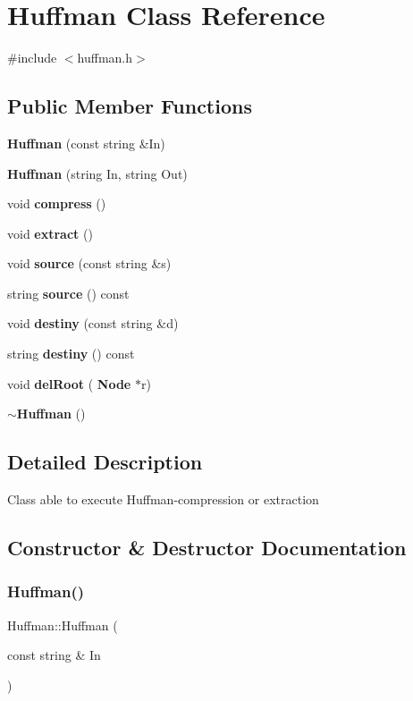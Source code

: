 \section{Huffman Class Reference}
\label{class_huffman}


{\ttfamily \#include $<$huffman.\+h$>$}

\subsection*{Public Member Functions}
\begin{DoxyCompactItemize}
\item 
\textbf{ Huffman} (const string \&In)
\item 
\textbf{ Huffman} (string In, string Out)
\item 
void \textbf{ compress} ()
\item 
void \textbf{ extract} ()
\item 
void \textbf{ source} (const string \&s)
\item 
string \textbf{ source} () const
\item 
void \textbf{ destiny} (const string \&d)
\item 
string \textbf{ destiny} () const
\item 
void \textbf{ del\+Root} (\textbf{ Node} $\ast$r)
\item 
\textbf{ $\sim$\+Huffman} ()
\end{DoxyCompactItemize}


\subsection{Detailed Description}
Class able to execute Huffman-\/compression or extraction 

\subsection{Constructor \& Destructor Documentation}
\mbox{\label{class_huffman_a381daf47396ec56b139f5a80db01371a}} 
\subsubsection{Huffman()\hspace{0.1cm}{\footnotesize\ttfamily [1/2]}}
{\footnotesize\ttfamily Huffman\+::\+Huffman (\begin{DoxyParamCaption}\item[{const string \&}]{In }\end{DoxyParamCaption})\hspace{0.3cm}{\ttfamily [explicit]}}

